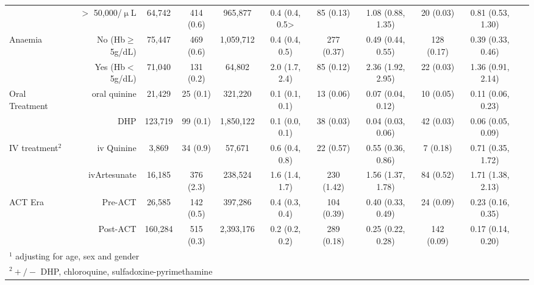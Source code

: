 \begin{landscape}
\begin{table}
\begin{tabular}{lrccccccccc}
								&	$>$ 50,000/$\upmu$L         & 64,742   		&  414 (0.6)			 & 965,877   				& 0.4 (0.4, 0.5>  &   85 (0.13)   &  1.08 (0.88, 1.35)  &	 20 (0.03)   &  0.81 (0.53, 1.30)   \\    [3.5pt]
Anaemia 						&	No 	(Hb$\geq$5g/dL)			& 75,447    	&  469 (0.6)			 & 1,059,712 				& 0.4 (0.4, 0.5)  &  277 (0.37)   &  0.49 (0.44, 0.55)  &	128 (0.17)   &  0.39 (0.33, 0.46)	 \\   
								&	Yes  (Hb$<$5g/dL)         	& 71,040    	&  131 (0.2)			 & 64,802    				& 2.0 (1.7, 2.4)  &   85 (0.12)   &  2.36 (1.92, 2.95)  &	 22 (0.03)   &  1.36 (0.91, 2.14)	 \\   [3.5pt]
Oral Treatment					&	oral quinine				& 21,429    	&   25 (0.1)			 & 321,220   				& 0.1 (0.1, 0.1)  &   13 (0.06)   &  0.07 (0.04, 0.12)  &	 10 (0.05)   &  0.11 (0.06, 0.23)	 \\   
								&	DHP                       	& 123,719  		&   99 (0.1)			 & 1,850,122 				& 0.1 (0.0, 0.1)  &   38 (0.03)   &  0.04 (0.03, 0.06)	&	 42 (0.03)   &  0.06 (0.05, 0.09)   \\    [3.5pt]
IV treatment$^2$				&	iv Quinine	     			& 3,869  		&   34 (0.9)			 & 57,671    				& 0.6 (0.4, 0.8)  &   22 (0.57)   &  0.55 (0.36, 0.86)  &	  7 (0.18)   &  0.71 (0.35, 1.72)   \\	  
								&	ivArtesunate     			& 16,185  		&  376 (2.3)			 & 238,524   				& 1.6 (1.4, 1.7)  &  230 (1.42)   &  1.56 (1.37, 1.78)  &	 84 (0.52)   &  1.71 (1.38, 2.13)   \\    [3.5pt] 
ACT Era							&	Pre-ACT                   	& 26,585    	&  142 (0.5)			 & 397,286   				& 0.4 (0.3, 0.4)  &  104 (0.39)   &  0.40 (0.33, 0.49)  &	 24 (0.09)   &  0.23 (0.16, 0.35)	 \\   
								&	Post-ACT                  	& 160,284   	&  515 (0.3)			 & 2,393,176 				& 0.2 (0.2, 0.2)  &  289 (0.18)   &  0.25 (0.22, 0.28)  &	142 (0.09)   &  0.17 (0.14, 0.20)	 \\   
\bottomrule 
\multicolumn{10}{l}{$^1$ adjusting for age, sex and gender}  \\
\multicolumn{10}{l}{$^2 +/-$ DHP, chloroquine, sulfadoxine-pyrimethamine} \\			
\end{tabular}
\end{table}
\end{landscape}    
\doublespacing


























